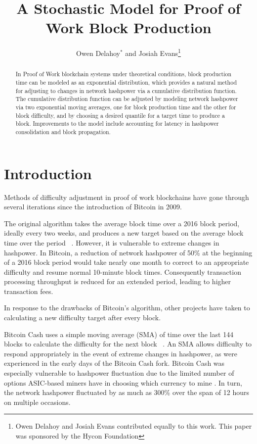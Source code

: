 \documentclass[]{article}
\title{A Stochastic Model for Proof of Work Block Production}
\author{Owen Delahoy$^*$ and Josiah Evans\footnote{Owen Delahoy and Josiah Evans contributed equally to this work. This paper was sponsored by the Hycon Foundation}}
\begin{document}
\maketitle


\begin{abstract}
In Proof of Work blockchain systems under theoretical conditions, block production time can be modeled as an exponential distribution, which provides a natural method for adjusting to changes in network hashpower via a cumulative distribution function.  The cumulative distribution function can be adjusted by modeling network hashpower via two exponential moving averages, one for block production time and the other for block difficulty, and by choosing a desired quantile for a target time to produce a block.  Improvements to the model include accounting for latency in hashpower consolidation and block propagation.     
\end{abstract}

\section{Introduction}
Methods of difficulty adjustment in proof of work blockchains have gone through several iterations since the introduction of Bitcoin in 2009.  
\newline

The original algorithm takes the average block time over a 2016 block period, ideally every two weeks, and produces a new target based on the average block time over the period ~\cite{BitcoinRetarget}.  However, it is vulnerable to extreme changes in hashpower.  In Bitcoin, a reduction of network hashpower of 50\% at the beginning of a 2016 block period would take nearly one month to correct to an appropriate difficulty and resume normal 10-minute block times.  Consequently transaction processing throughput is reduced for an extended period, leading to higher transaction fees.   
\newline

In response to the drawbacks of Bitcoin's algorithm, other projects have taken to calculating a new difficulty target after every block.   
\newline

Bitcoin Cash uses a simple moving average (SMA) of time over the last 144 blocks to calculate the difficulty for the next block ~\cite{Bitcoin-ABC}.  An SMA allows difficulty to respond appropriately in the event of extreme changes in hashpower, as were experienced in the early days of the Bitcoin Cash fork.  Bitcoin Cash was especially vulnerable to hashpower fluctuation due to the limited number of options ASIC-based miners have in choosing which currency to mine \cite{BitcoinCashMining}.  In turn, the network hashpower fluctuated by as much as 300\% \cite{BitcoinCashDifficulty} over the span of 12 hours on multiple occasions.   
\newline
\end{document}
